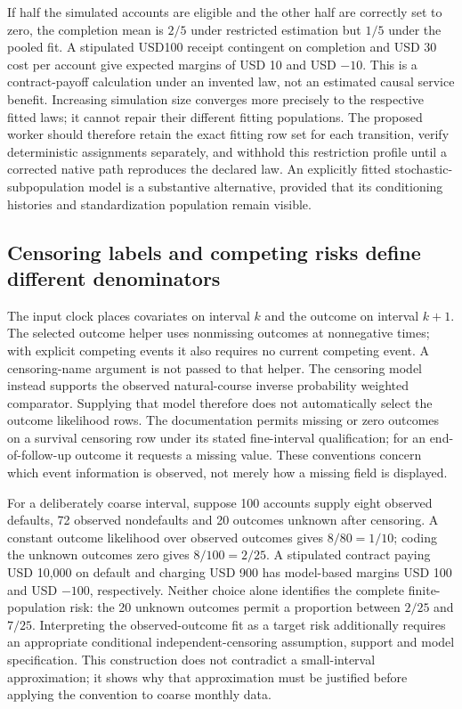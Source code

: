 If half the simulated accounts are eligible and the other half are correctly
set to zero, the completion mean is $2/5$ under restricted estimation but
$1/5$ under the pooled fit. A stipulated USD100 receipt contingent on completion
and USD 30 cost per account give expected margins of USD 10 and USD $-10$.
This is a contract-payoff calculation under an invented law, not an estimated
causal service benefit. Increasing simulation size converges more precisely
to the respective fitted laws; it cannot repair their different fitting
populations. The proposed worker should therefore retain the exact fitting
row set for each transition, verify deterministic assignments separately, and
withhold this restriction profile until a corrected native path reproduces
the declared law. An explicitly fitted stochastic-subpopulation model is a
substantive alternative, provided that its conditioning histories and
standardization population remain visible.~\citep{rel25pygwitness,rel25pygfit}

\subsection{Censoring labels and competing risks define different denominators}
The input clock places covariates on interval $k$ and the outcome on
interval $k+1$. The selected outcome helper uses nonmissing outcomes at
nonnegative times; with explicit competing events it also requires no current
competing event. A censoring-name argument is not passed to that helper.
The censoring model instead supports the observed natural-course inverse
probability weighted comparator. Supplying that model therefore does not
automatically select the outcome likelihood rows. The documentation permits
missing or zero outcomes on a survival censoring row under its stated
fine-interval qualification; for an end-of-follow-up outcome it requests a
missing value. These conventions concern which event information is observed,
not merely how a missing field is displayed.~\citep{rel25pygfit}

For a deliberately coarse interval, suppose 100 accounts supply eight observed
defaults, 72 observed nondefaults and 20 outcomes unknown after censoring.
A constant outcome likelihood over observed outcomes gives $8/80=1/10$;
coding the unknown outcomes zero gives $8/100=2/25$. A stipulated contract
paying USD 10,000 on default and charging USD 900 has model-based margins
USD 100 and USD $-100$, respectively. Neither choice alone identifies the
complete finite-population risk: the 20 unknown outcomes permit a proportion
between $2/25$ and $7/25$. Interpreting the observed-outcome fit as a target
risk additionally requires an appropriate conditional independent-censoring
assumption, support and model specification. This construction does not
contradict a small-interval approximation; it shows why that approximation
must be justified before applying the convention to coarse monthly data.
\citep{rel25pygwitness,rel25pygfit}

